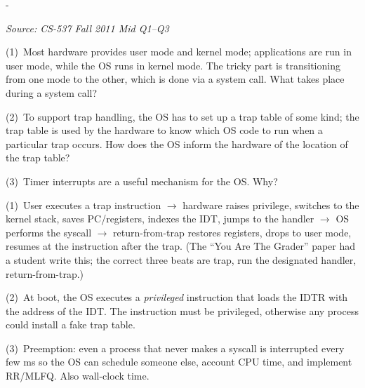 \documentclass[11pt,a4paper]{article}
\makeatletter
\newcommand{\keepspace}[1]{\par\penalty-100\begingroup
  \setlength{\dimen@}{#1}\dimen@ii\pagegoal\advance\dimen@ii-\pagetotal
  \ifdim\dimen@>\dimen@ii\ifdim\dimen@ii>\z@\vfil\fi\break\fi\endgroup}
\newcounter{qn}[section]
\newenvironment{Qn}[4]{%
  \refstepcounter{qn}\keepspace{7\baselineskip}%
  \begin{tcolorbox}[qboxstyle, title={Q\thesection.\theqn\ \ [#1 \textbar\ #2]\ \ #4}]%
  {\footnotesize\color{g3}\textit{Source: #3}}\par\smallskip%
}{%
  \end{tcolorbox}%
}
\newenvironment{Sol}{%
  \begin{tcolorbox}[sboxstyle, title={Solution}]%
}{%
  \end{tcolorbox}\vspace{0.35em}%
}
\makeatother
\begin{document}
\begin{Qn}{Medium}{Lect 4}{CS-537 Fall 2011 Mid Q1--Q3}{Syscall steps, installing the trap table, why a timer interrupt}
(1)~Most hardware provides user mode and kernel mode; applications are run in user mode, while the OS runs in kernel mode. The tricky part is transitioning from one mode to the other, which is done via a system call. What takes place during a system call?

(2)~To support trap handling, the OS has to set up a trap table of some kind; the trap table is used by the hardware to know which OS code to run when a particular trap occurs. How does the OS inform the hardware of the location of the trap table?

(3)~Timer interrupts are a useful mechanism for the OS. Why?
\end{Qn}
\begin{Sol}
(1)~User executes a trap instruction $\to$ hardware raises privilege, switches to the kernel stack, saves PC/registers, indexes the IDT, jumps to the handler $\to$ OS performs the syscall $\to$ return-from-trap restores registers, drops to user mode, resumes at the instruction after the trap. (The ``You Are The Grader'' paper had a student write this; the correct three beats are trap, run the designated handler, return-from-trap.)

(2)~At boot, the OS executes a \emph{privileged} instruction that loads the IDTR with the address of the IDT. The instruction must be privileged, otherwise any process could install a fake trap table.

(3)~Preemption: even a process that never makes a syscall is interrupted every few ms so the OS can schedule someone else, account CPU time, and implement RR/MLFQ. Also wall-clock time.
\end{Sol}
\end{document}
